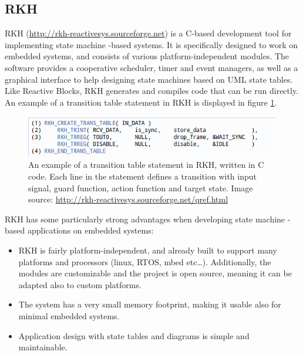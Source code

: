\subsection{RKH}
RKH (\url{http://rkh-reactivesys.sourceforge.net}) is a C-based development tool for implementing state machine -based systems. It is specifically designed to work on embedded systems, and consists of various platform-independent modules. The software provides a cooperative scheduler, timer and event managers, as well as a graphical interface to help designing state machines based on UML state tables. Like Reactive Blocks, RKH generates and compiles code that can be run directly. An example of a transition table statement in RKH is displayed in figure \ref{figure:rkh_transition}.

\begin{figure}[h]
	\centering
	\includegraphics[scale=0.7]{img/rkh_transition_table.png}
	\caption[A transition table statement in RKH]{An example of a transition table statement in RKH, written in C code. Each line in the statement defines a transition with input signal, guard function, action function and target state. Image source: \url{http://rkh-reactivesys.sourceforge.net/qref.html} \label{figure:rkh_transition} }
\end{figure}


RKH has some particularly strong advantages when developing state machine -based applications on embedded systems:
\begin{itemize}
\item RKH is fairly platform-independent, and already built to support many platforms and processors (linux, RTOS, mbed etc…). Additionally, the modules are customizable and the project is open source, meaning it can be adapted also to custom platforms.
\item The system has a very small memory footprint, making it usable also for minimal embedded systems.
\item Application design with state tables and diagrams is simple and maintainable.
\end{itemize}

